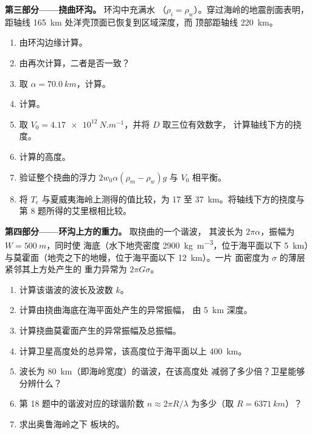 \begin{problem}
\noindent\textbf{第三部分——挠曲环沟。} 环沟中充满水
（$\rho_i = \rho_w$）。穿过海岭的地震剖面表明，
距轴线 \qty{165}{km} 处洋壳顶面已恢复到区域深度，而
顶部距轴线 \qty{220}{km}。
\begin{enumerate}[resume]
  \item 由环沟边缘计算。
  \item 由再次计算，二者是否一致？
  \item 取 $\alpha = \qty{70.0}{km}$，计算。
  \item 计算。
  \item 取 $V_0 = \qty{4.17e12}{N.m^{-1}}$，并将 $D$ 取三位有效数字，
        计算轴线下方的挠度。
  \item 计算的高度。
  \item 验证整个挠曲的浮力 $2w_0\alpha(\rho_m -
        \rho_w)g$ 与 $V_0$ 相平衡。
  \item 将 $T_e$ 与夏威夷海岭上测得的值比较，为 17 至
        \qty{37}{km}。将轴线下方的挠度与
        第 8 题所得的艾里根相比较。
\end{enumerate}

\noindent\textbf{第四部分——环沟上方的重力。} 取挠曲的一个谐波，
其波长为 $2\pi\alpha$，振幅为 $W = \qty{500}{m}$，同时使
海底（水下地壳密度 \qty{2900}{kg.m^{-3}}，位于海平面以下
\qty{5}{km}）与莫霍面（地壳之下的地幔，位于海平面以下 \qty{12}{km}）。一片
面密度为 $\sigma$ 的薄层紧邻其上方处产生的
重力异常为 $2\pi G\sigma$。
\begin{enumerate}[resume]
  \item 计算该谐波的波长及波数 $k$。
  \item 计算由挠曲海底在海平面处产生的异常振幅，
        由 \qty{5}{km} 深度。
  \item 计算挠曲莫霍面产生的异常振幅及总振幅。
  \item 计算卫星高度处的总异常，该高度位于海平面以上
        \qty{400}{km}。
  \item 波长为 \qty{80}{km}（即海岭宽度）的谐波，在该高度处
        减弱了多少倍？卫星能够分辨什么？
  \item 第 18 题中的谐波对应的球谐阶数 $n \approx 2\pi R/\lambda$
        为多少（取 $R = \qty{6371}{km}$）？
  \item 求出奥鲁海岭之下
        板块的。
\end{enumerate}
\end{problem}
